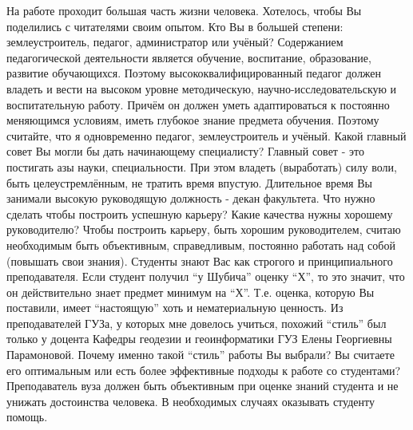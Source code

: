 \begin{drama}
	\maxspeaks На работе проходит большая часть жизни человека. Хотелось, чтобы Вы поделились с читателями своим опытом. Кто Вы в большей степени: землеустроитель, педагог, администратор или учёный?
	\michaelspeaks Содержанием педагогической деятельности является обучение, воспитание, образование, развитие обучающихся. Поэтому высококвалифицированный педагог должен владеть и вести на высоком уровне методическую, научно-исследовательскую и воспитательную работу. Причём он должен уметь адаптироваться к постоянно меняющимся условиям, иметь глубокое знание предмета обучения. Поэтому считайте, что я одновременно педагог, землеустроитель и учёный.
	\maxspeaks Какой главный совет Вы могли бы дать начинающему специалисту?
	\michaelspeaks Главный совет - это постигать азы науки, специальности. При этом владеть (выработать) силу воли, быть целеустремлённым, не тратить время впустую.
	\maxspeaks Длительное время Вы занимали высокую руководящую должность - декан факультета. Что нужно сделать чтобы построить успешную карьеру? Какие качества нужны хорошему руководителю?
	\michaelspeaks Чтобы построить карьеру, быть хорошим руководителем, считаю необходимым быть объективным, справедливым, постоянно работать над собой (повышать свои знания).
	\maxspeaks Студенты знают Вас как строгого и принципиального преподавателя. Если студент получил “у Шубича” оценку “Х”, то это значит, что он действительно знает предмет минимум на “Х”. Т.е. оценка, которую Вы поставили, имеет “настоящую” хоть и нематериальную ценность. Из преподавателей ГУЗа, у которых мне довелось учиться, похожий “стиль” был только у доцента Кафедры геодезии и геоинформатики ГУЗ Елены Георгиевны Парамоновой. Почему именно такой “стиль” работы Вы выбрали? Вы считаете его оптимальным или есть более эффективные подходы к работе со студентами?
	\michaelspeaks Преподаватель вуза должен быть объективным при оценке знаний студента и не унижать достоинства человека. В необходимых случаях оказывать студенту помощь.


\end{drama}
